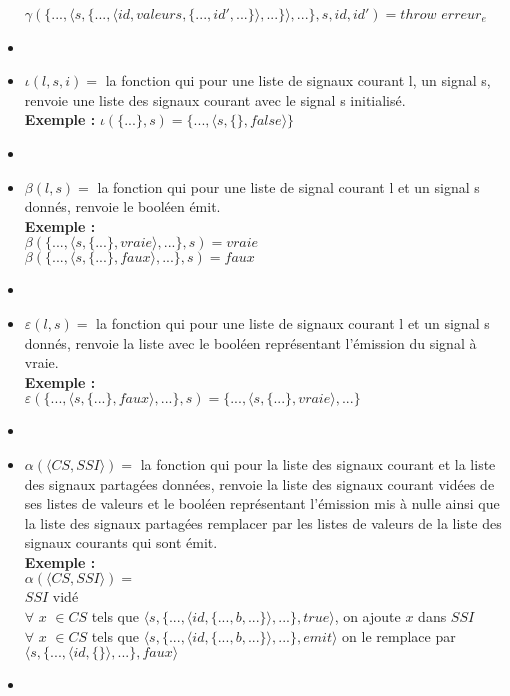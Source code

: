 \documentclass[10pt,a4paper]{article}
\begin{document}
\begin{itemize}
					$\gamma(\{...,\langle s,\{...,\langle id,valeurs,\{...,id',...\}\rangle,...\}\rangle,...\},s,id,id') = throw$ $erreur_{e}$
					\item[]
					\item[] $\iota(l,s,i) =$ la fonction qui pour une liste de signaux courant l, un signal s, renvoie une liste des signaux courant avec le signal s initialisé.
					\\\textbf{Exemple :} $\iota(\{...\},s) = \{...,\langle s,\{\},false\rangle\}$
					\item[]
					\item[] $\beta(l,s) =$ la fonction qui pour une liste de signal courant l et un signal s donnés, renvoie le booléen émit.
					\\\textbf{Exemple :}
					\\ $\beta(\{...,\langle s,\{...\},vraie\rangle,...\},s) = vraie$\\
					$\beta(\{...,\langle s,\{...\},faux\rangle,...\},s) = faux$
					\item[] 
					\item[] $\varepsilon(l,s) =$ la fonction qui pour une liste de signaux courant l et un signal s donnés, renvoie la liste avec le booléen représentant l'émission du signal à vraie.
					\\\textbf{Exemple :}
					\\ $\varepsilon(\{...,\langle s,\{...\},faux\rangle,...\},s) = \{...,\langle s,\{...\},vraie\rangle,...\}$
					\item[] 
					\item[] $\alpha(\langle CS,SSI\rangle) =$ la fonction qui pour la liste des signaux courant et la liste des signaux partagées données, renvoie la liste des signaux courant vidées de ses listes de valeurs et le booléen représentant l'émission mis à nulle ainsi que la liste des signaux partagées remplacer par les listes de valeurs de la liste des signaux courants qui sont émit.
					\\\textbf{Exemple :}
					\\ $\alpha(\langle CS,SSI\rangle) =$
					\\ $SSI$ vidé
					\\ $\forall$ $x$ $\in CS$ tels que $\langle s,\{...,\langle id,\{...,b,...\}\rangle,...\},true\rangle$, on ajoute $x$ dans $SSI$
					\\ $\forall$ $x$ $\in CS$ tels que $\langle s,\{...,\langle id,\{...,b,...\}\rangle,...\},emit\rangle$ on le remplace par $\langle s,\{...,\langle id,\{\}\rangle,...\},faux\rangle$ 
					\item[] 
				\end{itemize}
				\newpage
				
\end{document}
